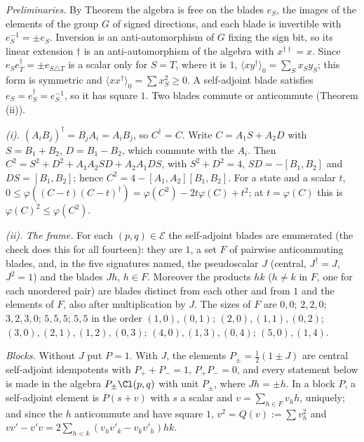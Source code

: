 \emph{Preliminaries.} By Theorem  the algebra is free on the blades $e_{S}$, the images of the elements of the group $G$ of signed directions, and each blade is invertible with $e_{S}^{-1} = \pm e_{S}$. Inversion is an anti-automorphism of $G$ fixing the sign bit, so its linear extension $\dagger$ is an anti-automorphism of the algebra with $x^{\dagger\dagger} = x$. Since $e_{S}e_{T}^{\dagger} = \pm e_{S \triangle T}$ is a scalar only for $S = T$, where it is $1$, $\langle xy^{\dagger}\rangle_{0} = \sum_{S}x_{S}y_{S}$; this form is symmetric and $\langle xx^{\dagger}\rangle_{0} = \sum x_{S}^{2} \ge 0$. A self-adjoint blade satisfies $e_{S} = e_{S}^{\dagger} = e_{S}^{-1}$, so it has square $1$. Two blades commute or anticommute (Theorem (ii)).

\emph{(i).} $(A_{i}B_{j})^{\dagger} = B_{j}A_{i} = A_{i}B_{j}$, so $C^{\dagger} = C$. Write $C = A_{1}S + A_{2}D$ with $S = B_{1} + B_{2}$, $D = B_{1} - B_{2}$, which commute with the $A_{i}$. Then $C^{2} = S^{2} + D^{2} + A_{1}A_{2}SD + A_{2}A_{1}DS$, with $S^{2} + D^{2} = 4$, $SD = -[B_{1},B_{2}]$ and $DS = [B_{1},B_{2}]$; hence $C^{2} = 4 - [A_{1},A_{2}][B_{1},B_{2}]$. For a state and a scalar $t$, $0 \le \varphi((C - t)(C - t)^{\dagger}) = \varphi(C^{2}) - 2t\varphi(C) + t^{2}$; at $t = \varphi(C)$ this is $\varphi(C)^{2} \le \varphi(C^{2})$.

\emph{(ii).} \emph{The frame.} For each $(p,q) \in \mathcal{E}$ the self-adjoint blades are enumerated (the check does this for all fourteen): they are $1$, a set $F$ of pairwise anticommuting blades, and, in the five signatures named, the pseudoscalar $J$ (central, $J^{\dagger} = J$, $J^{2} = 1$) and the blades $Jh$, $h \in F$. Moreover the products $hk$ ($h \ne k$ in $F$, one for each unordered pair) are blades distinct from each other and from $1$ and the elements of $F$, also after multiplication by $J$. The sizes of $F$ are $0, 0$; $2, 2, 0$; $3, 2, 3, 0$; $5, 5, 5$; $5, 5$ in the order $(1,0), (0,1)$; $(2,0), (1,1), (0,2)$; $(3,0), (2,1), (1,2), (0,3)$; $(4,0), (1,3), (0,4)$; $(5,0), (1,4)$.

\emph{Blocks.} Without $J$ put $P = 1$. With $J$, the elements $P_{\pm} = \tfrac12(1 \pm J)$ are central self-adjoint idempotents with $P_{+} + P_{-} = 1$, $P_{+}P_{-} = 0$, and every statement below is made in the algebra $P_{\pm}\Cl(p,q)$ with unit $P_{\pm}$, where $Jh = \pm h$. In a block $P$, a self-adjoint element is $P(s + v)$ with $s$ a scalar and $v = \sum_{h \in F}v_{h}h$, uniquely; and since the $h$ anticommute and have square $1$, $v^{2} = Q(v) := \sum v_{h}^{2}$ and $vv' - v'v = 2\sum_{h < k}(v_{h}v'_{k} - v_{k}v'_{h})hk$.

